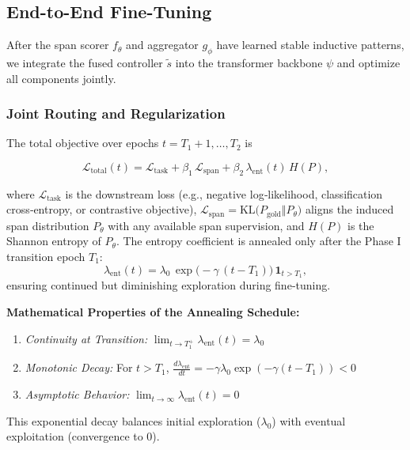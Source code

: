 \subsection{End-to-End Fine-Tuning}
\label{sec:end-to-end-finetuning}

After the span scorer \(f_\theta\) and aggregator \(g_\phi\) have learned stable inductive patterns, we integrate the fused controller \(\tilde{s}\) into the transformer backbone \(\psi\) and optimize all components jointly.

\subsubsection{Joint Routing and Regularization}
\label{sec:joint-routing-regularization}

The total objective over epochs \(t=T_1+1,\dots,T_2\) is

\begin{equation}
	\mathcal{L}_{\mathrm{total}}(t)
	= \mathcal{L}_{\mathrm{task}}
	+ \beta_{1}\,\mathcal{L}_{\mathrm{span}}
	+ \beta_{2}\,\lambda_{\mathrm{ent}}(t)\,H(P),
	\label{eq:curriculum_total}
\end{equation}

where
\(\mathcal{L}_{\mathrm{task}}\) is the downstream loss (e.g., negative log‐likelihood, classification cross‐entropy, or contrastive objective),  
\(\mathcal{L}_{\mathrm{span}} = \mathrm{KL}\bigl(P_{\mathrm{gold}}\Vert P_{\theta}\bigr)\) aligns the induced span distribution \(P_\theta\) with any available span supervision, and  
\(H(P)\) is the Shannon entropy of \(P_\theta\).  
The entropy coefficient is annealed only after the Phase I transition epoch \(T_1\):
\begin{equation}
\lambda_{\mathrm{ent}}(t)
= \lambda_{0}\,\exp\bigl(-\gamma\,(t - T_1)\bigr)\,\mathbf{1}_{t > T_1},
\label{eq:entropy_schedule}
\end{equation}
ensuring continued but diminishing exploration during fine‐tuning.

\textbf{Mathematical Properties of the Annealing Schedule:}
\begin{enumerate}[leftmargin=1.5em]
\item \emph{Continuity at Transition:} \(\lim_{t \to T_1^+} \lambda_{\mathrm{ent}}(t) = \lambda_0\)
\item \emph{Monotonic Decay:} For \(t > T_1\), \(\frac{d\lambda_{\mathrm{ent}}}{dt} = -\gamma \lambda_0 \exp(-\gamma(t-T_1)) < 0\)
\item \emph{Asymptotic Behavior:} \(\lim_{t \to \infty} \lambda_{\mathrm{ent}}(t) = 0\)
\end{enumerate}
This exponential decay balances initial exploration (\(\lambda_0\)) with eventual exploitation (convergence to 0).

